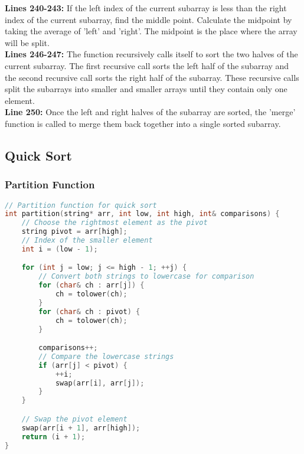 \documentclass[letterpaper, 10pt,DIV=13]{scrartcl}
\numberwithin{equation}{section} %
\numberwithin{figure}{section} %
\numberwithin{table}{section} %
\begin{document}
\textbf{Lines 240-243:}  If the left index of the current subarray is less than the right index of the current subarray, find the middle point. Calculate the midpoint by taking the average of 'left' and 'right'. The midpoint is the place where the array will be split. \\
\textbf{Lines 246-247:} The function recursively calls itself to sort the two halves of the current subarray. The first recursive call sorts the left half of the subarray and the second recursive call sorts the right half of the subarray. These recursive calls split the subarrays into smaller and smaller arrays until they contain only one element. \\
\textbf{Line 250:} Once the left and right halves of the subarray are sorted, the 'merge' function is called to merge them back together into a single sorted subarray.

\subsection{Quick Sort}
\subsubsection{Partition Function}
\begin{linenumbers}
\begin{lstlisting}[language=C++, caption={Partition Function}, label={code:example}]
// Partition function for quick sort
int partition(string* arr, int low, int high, int& comparisons) {
    // Choose the rightmost element as the pivot
    string pivot = arr[high]; 
    // Index of the smaller element
    int i = (low - 1); 

    for (int j = low; j <= high - 1; ++j) {
        // Convert both strings to lowercase for comparison
        for (char& ch : arr[j]) {
            ch = tolower(ch);
        }
        for (char& ch : pivot) {
            ch = tolower(ch);
        }

        comparisons++;
        // Compare the lowercase strings
        if (arr[j] < pivot) {
            ++i; 
            swap(arr[i], arr[j]);
        }
    }

    // Swap the pivot element
    swap(arr[i + 1], arr[high]);
    return (i + 1);
}
\end{lstlisting}
\end{linenumbers}
\nolinenumbers
\end{document}
